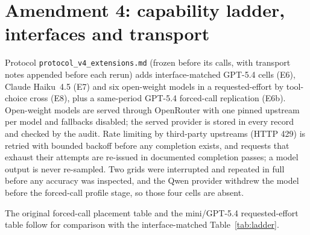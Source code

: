 \section{Amendment 4: capability ladder, interfaces and transport}
\label{app:ladder}
Protocol \texttt{protocol\_v4\_extensions.md} (frozen before its calls, with transport notes
appended before each rerun) adds interface-matched GPT-5.4 cells (E6), Claude Haiku~4.5 (E7)
and six open-weight models in a requested-effort by tool-choice cross (E8), plus a same-period
GPT-5.4 forced-call replication (E6b). Open-weight models are served through OpenRouter with
one pinned upstream per model and fallbacks disabled; the served provider is stored in every
record and checked by the audit. Rate limiting by third-party upstreams (HTTP 429) is retried
with bounded backoff before any completion exists, and requests that exhaust their attempts
are re-issued in documented completion passes; a model output is never re-sampled. Two
grids were interrupted and repeated in full before any accuracy was inspected, and the Qwen
provider withdrew the model before the forced-call profile stage, so those four cells are
absent.


The original forced-call placement table and the mini/GPT-5.4 requested-effort table follow
for comparison with the interface-matched Table~\ref{tab:ladder}.



